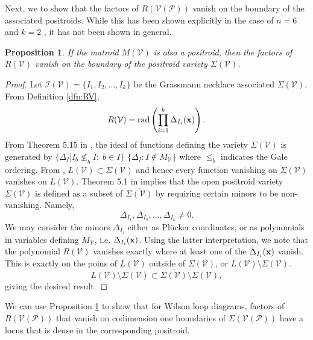 \documentclass[11pt]{article}
\newcommand{\sanote}{\todo[color=violet!30]}
\newcommand{\cP}{\mathcal{P}}
\newcommand{\cV}{\mathcal{V}}
\newcommand{\VP}{\cV(\cP)}
\newcommand{\cI}{\mathcal{I}}
\newtheorem{prop}[thm]{Proposition}
\theoremstyle{remark}
\theoremstyle{definition}
\begin{document}
Next, we to show that the factors of $R(\VP)$ vanish on the boundary of the associated positroids. While this has been shown explicitly in the case of $n = 6$ and $k=2$ \cite{casestudy}, it has not been shown in general.


\begin{prop}\label{res:vanishonbdny} 
If the matroid $M(\cV)$ is also a positroid, then the factors of $R(\cV)$ vanish on the boundary of the positroid variety $\Sigma(\cV)$.
\end{prop}


\begin{proof}
Let $\cI(\cV) = \{I_1, I_2, \dots, I_k\}$ be the Grassmann necklace associated $\Sigma(\cV)$. From Definition \ref{dfn:RV}, 
%
\begin{displaymath}
R(\cV) = \mathrm{rad}\left(\prod_{i = 1}^{k} \Delta_{I_i}(\bf{x})\right).
\end{displaymath}
%
From Theorem 5.15 in \cite{Juggling}, the ideal of functions defining the variety $\overline{\Sigma(\cV)}$ is generated by $\{\Delta_I | I_b \not \leq_b I; \; b \in I\}$ \st{$\{\Delta_I : I \notin M_{\cV}\}$} where $\leq_b$ indicates the Gale ordering. From \cite[Theorem 5.1]{basisshapeloci}, $L(\cV) \subset \overline{\Sigma(\cV)}$ and hence every function vanishing on $\Sigma(\cV)$ vanishes on $L(\cV)$. Theorem 5.1 in \cite{Juggling} implies that the open positroid variety $\Sigma(\cV)$ is defined as a subset of $\overline{\Sigma(\cV)}$ by requiring certain minors to be non-vanishing. Namely, 
%
\begin{displaymath}
\Delta_{I_1}, \Delta_{I_2}, \dots, \Delta_{I_k} \neq 0.
\end{displaymath}
%
We may consider the minors $\Delta_{I_i}$ either as Pl\"{u}cker coordinates, or as polynomials in variables defining $M_{\cV}$, i.e. $\Delta_{I_i}(\bf{x})$. Using the latter interpretation, we note that the polynomial $R(\cV)$ vanishes exactly where at least one of the $\Delta_{I_i}(\bf{x})$ vanish. This is exactly  on the poins of $L(\cV)$ outside of $\Sigma(\cV)$, or $L(\cV) \setminus \Sigma(\cV)$. 
%
\begin{displaymath}
L(\cV) \setminus \Sigma(\cV) \subset \overline{\Sigma(\cV)} \setminus \Sigma(\cV), 
\end{displaymath} giving the desired result.
\end{proof}

We can use Proposition \ref{res:vanishonbdny} to show that for Wilson loop diagrams, factors of $R(\VP)$ that vanish on codimension one boundaries of $\Sigma(\VP)$ have a locus that is dense in the corresponding positroid. \sanote{Cam, did I break this?}
\end{document}
